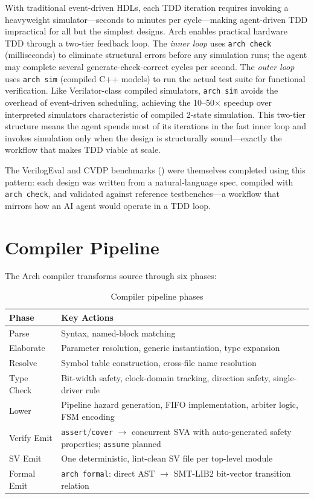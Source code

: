 \documentclass[11pt,twocolumn]{article}
\begin{document}
With traditional event-driven HDLs, each TDD iteration requires invoking a heavyweight simulator---seconds to minutes per cycle---making agent-driven TDD impractical for all but the simplest designs. Arch enables practical hardware TDD through a two-tier feedback loop. The \emph{inner loop} uses \texttt{arch check} (milliseconds) to eliminate structural errors before any simulation runs; the agent may complete several generate-check-correct cycles per second. The \emph{outer loop} uses \texttt{arch sim} (compiled C++ models) to run the actual test suite for functional verification. Like Verilator-class compiled simulators, \texttt{arch sim} avoids the overhead of event-driven scheduling, achieving the 10--50$\times$ speedup over interpreted simulators characteristic of compiled 2-state simulation. This two-tier structure means the agent spends most of its iterations in the fast inner loop and invokes simulation only when the design is structurally sound---exactly the workflow that makes TDD viable at scale.

The VerilogEval and CVDP benchmarks () were themselves completed using this pattern: each design was written from a natural-language spec, compiled with \texttt{arch check}, and validated against reference testbenches---a workflow that mirrors how an AI agent would operate in a TDD loop.

\section{Compiler Pipeline}\label{sec:compiler}

The Arch compiler transforms source through six phases:

\begin{table}[t]
\centering
\caption{Compiler pipeline phases}
\label{tab:compiler}
\small
\begin{tabular}{@{}lp{5cm}@{}}
\toprule
\textbf{Phase} & \textbf{Key Actions} \\
\midrule
Parse & Syntax, named-block matching \\
Elaborate & Parameter resolution, generic instantiation, type expansion \\
Resolve & Symbol table construction, cross-file name resolution \\
Type Check & Bit-width safety, clock-domain tracking, direction safety, single-driver rule \\
Lower & Pipeline hazard generation, FIFO implementation, arbiter logic, FSM encoding \\
Verify Emit & \texttt{assert}/\texttt{cover} $\to$ concurrent SVA with auto-generated safety properties; \texttt{assume} planned \\
SV Emit & One deterministic, lint-clean SV file per top-level module \\
Formal Emit & \texttt{arch formal}: direct AST $\to$ SMT-LIB2 bit-vector transition relation \\
\bottomrule
\end{tabular}
\end{table}
\end{document}
